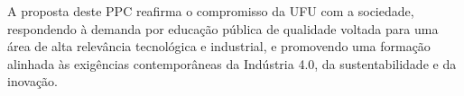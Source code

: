 A proposta deste PPC reafirma o compromisso da UFU com a sociedade, respondendo à demanda por educação pública de qualidade voltada para uma área de alta relevância tecnológica e industrial, e promovendo uma formação alinhada às exigências contemporâneas da Indústria 4.0, da sustentabilidade e da inovação.
